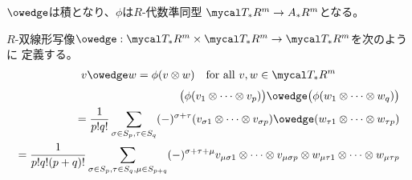 {	\begin{todo}[ここまで]\label{todo:ここまで} %
	\end{todo} %

	$\owedge$は積となり、$\phi$は$R$-代数準同型
	$\T_*R^m\to A_*R^m$となる。

	$R$-双線形写像$\owedge:\T_*R^m\times \T_*R^m\to \T_*R^m$を次のように
	定義する。
	\begin{equation*}\begin{split}
		v\owedge w = \phi(v\otimes w) \quad\text{for all } v,w\in \T_*R^m
	\end{split}\end{equation*}
	\begin{equation*}\begin{split}
		\bigl(\phi (v_1\otimes\cdots\otimes v_p)\bigr)
			\owedge \bigl(\phi (w_1\otimes\cdots\otimes w_q)\bigr) \\
		= \frac{1}{p!q!} \sum_{\sigma\in S_p,\tau\in S_q} (-)^{\sigma+\tau}
			(v_{\sigma1}\otimes\cdots\otimes v_{\sigma p})
			\owedge (w_{\tau1}\otimes\cdots\otimes w_{\tau p}) \\
		= \frac{1}{p!q!(p+q)!} \sum_{\sigma\in S_p,\tau\in S_q,\mu\in S_{p+q}}
			(-)^{\sigma+\tau+\mu}
			v_{\mu\sigma1}\otimes\cdots\otimes v_{\mu\sigma p}\otimes
			w_{\mu\tau1}\otimes\cdots\otimes w_{\mu\tau p} \\
	\end{split}\end{equation*}
}
